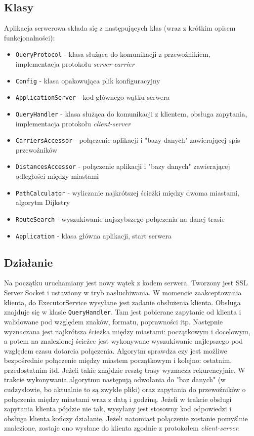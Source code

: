\documentclass[pdftex,13pt,a4paper]{article}
\begin{document}
\subsection{Klasy}
Aplikacja serwerowa składa się z następujących klas (wraz z krótkim opisem funkcjonalności):
\begin{itemize}
\item \texttt{QueryProtocol} - klasa służąca do komunikacji z przewoźnikiem, implementacja protokołu \textit{server-carrier}
\item \texttt{Config} - klasa opakowująca plik konfiguracyjny
\item \texttt{ApplicationServer} - kod głównego wątku serwera
\item \texttt{QueryHandler} - klasa służąca do komunikacji z klientem, obsługa zapytania, implementacja protokołu \textit{client-server}
\item \texttt{CarriersAccessor} - połączenie aplikacji i "bazy danych" zawierającej spis przewoźników
\item \texttt{DistancesAccessor} - połączenie aplikacji i "bazy danych" zawierającej odległości między miastami
\item \texttt{PathCalculator} - wyliczanie najkrótszej ścieżki między dwoma miastami, algorytm Dijkstry
\item \texttt{RouteSearch} - wyszukiwanie najszybszego połączenia na danej trasie
\item \texttt{Application} - klasa główna aplikacji, start serwera
\end{itemize}

\subsection{Działanie}
Na początku uruchamiany jest nowy wątek z kodem serwera. Tworzony jest SSL Server Socket i ustawiony w tryb nasłuchiwania. W momencie zaakceptowania klienta, do ExecutorService wysyłane jest zadanie obsłużenia klienta. Obsługa znajduje się w klasie \texttt{QueryHandler}. Tam jest pobierane zapytanie od klienta i walidowane pod względem znaków, formatu, poprawności itp. Następnie wyznaczana jest najkrótsza ścieżka między miastami: początkowym i docelowym, a potem na znalezionej ścieżce jest wykonywane wyszukiwanie najlepszego pod względem czasu dotarcia połączenia. Algorytm sprawdza czy jest możliwe bezpośrednie połączenie między miastem początkowym i kolejno: ostatnim, przedostatnim itd. Jeżeli takie znajdzie resztę trasy wyznacza rekurencyjnie. W trakcie wykonywania algorytmu następują odwołania do "baz danych" (w cudzysłowie, bo aktualnie to są zwykłe pliki) oraz zapytania do przewoźników o połączenia między miastami wraz z datą i godziną. Jeżeli w trakcie obsługi zapytania klienta pójdzie nie tak, wysyłany jest stosowny kod odpowiedzi i obsługa klienta kończy działanie. Jeżeli natomiast połączenie zostanie pomyślnie znalezione, zostaje ono wysłane do klienta zgodnie z protokołem \textit{client-server}.
\end{document}
